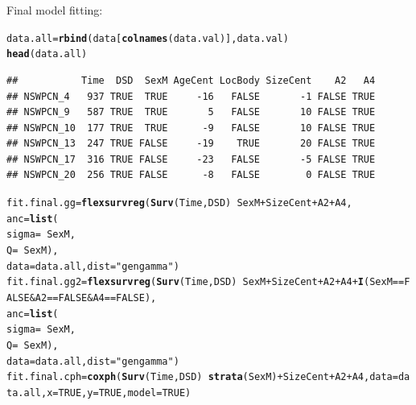 \documentclass{article}\usepackage[]{graphicx}\usepackage[]{color}
\makeatletter
\newcommand{\hlnum}[1]{\textcolor[rgb]{0.686,0.059,0.569}{#1}}%
\newcommand{\hlstr}[1]{\textcolor[rgb]{0.192,0.494,0.8}{#1}}%
\newcommand{\hlopt}[1]{\textcolor[rgb]{0,0,0}{#1}}%
\newcommand{\hlstd}[1]{\textcolor[rgb]{0.345,0.345,0.345}{#1}}%
\newcommand{\hlkwb}[1]{\textcolor[rgb]{0.69,0.353,0.396}{#1}}%
\newcommand{\hlkwc}[1]{\textcolor[rgb]{0.333,0.667,0.333}{#1}}%
\newcommand{\hlkwd}[1]{\textcolor[rgb]{0.737,0.353,0.396}{\textbf{#1}}}%
\newenvironment{kframe}{%
 \def\at@end@of@kframe{}%
 \ifinner\ifhmode%
  \def\at@end@of@kframe{\end{minipage}}%
  \begin{minipage}{\columnwidth}%
 \fi\fi%
 \def\FrameCommand##1{\hskip\@totalleftmargin \hskip-\fboxsep
 \colorbox{shadecolor}{##1}\hskip-\fboxsep
     \hskip-\linewidth \hskip-\@totalleftmargin \hskip\columnwidth}%
 \MakeFramed {\advance\hsize-\width
   \@totalleftmargin\z@ \linewidth\hsize
   \@setminipage}}%
 {\par\unskip\endMakeFramed%
 \at@end@of@kframe}
\newenvironment{knitrout}{}{} %
\makeatother
\begin{document}
Final model fitting:
\begin{knitrout}
\color{fgcolor}\begin{kframe}
\begin{alltt}
\hlstd{data.all} \hlkwb{=} \hlkwd{rbind}\hlstd{(data[}\hlkwd{colnames}\hlstd{(data.val)], data.val)}
\hlkwd{head}\hlstd{(data.all)}
\end{alltt}
\begin{verbatim}
##           Time  DSD  SexM AgeCent LocBody SizeCent    A2   A4
## NSWPCN_4   937 TRUE  TRUE     -16   FALSE       -1 FALSE TRUE
## NSWPCN_9   587 TRUE  TRUE       5   FALSE       10 FALSE TRUE
## NSWPCN_10  177 TRUE  TRUE      -9   FALSE       10 FALSE TRUE
## NSWPCN_13  247 TRUE FALSE     -19    TRUE       20 FALSE TRUE
## NSWPCN_17  316 TRUE FALSE     -23   FALSE       -5 FALSE TRUE
## NSWPCN_20  256 TRUE FALSE      -8   FALSE        0 FALSE TRUE
\end{verbatim}
\begin{alltt}
\hlstd{fit.final.gg} \hlkwb{=} \hlkwd{flexsurvreg}\hlstd{(}\hlkwd{Surv}\hlstd{(Time, DSD)} \hlopt{~} \hlstd{SexM} \hlopt{+} \hlstd{SizeCent} \hlopt{+} \hlstd{A2} \hlopt{+} \hlstd{A4,}
        \hlkwc{anc} \hlstd{=} \hlkwd{list}\hlstd{(}
                \hlkwc{sigma} \hlstd{=} \hlopt{~} \hlstd{SexM,}
                \hlkwc{Q} \hlstd{=} \hlopt{~} \hlstd{SexM),}
        \hlkwc{data} \hlstd{= data.all,} \hlkwc{dist} \hlstd{=} \hlstr{"gengamma"}\hlstd{)}
\hlstd{fit.final.gg2} \hlkwb{=} \hlkwd{flexsurvreg}\hlstd{(}\hlkwd{Surv}\hlstd{(Time, DSD)} \hlopt{~} \hlstd{SexM} \hlopt{+} \hlstd{SizeCent} \hlopt{+} \hlstd{A2} \hlopt{+} \hlstd{A4} \hlopt{+} \hlkwd{I}\hlstd{(SexM} \hlopt{==} \hlnum{FALSE} \hlopt{&} \hlstd{A2} \hlopt{==} \hlnum{FALSE} \hlopt{&} \hlstd{A4} \hlopt{==} \hlnum{FALSE}\hlstd{),}
    \hlkwc{anc} \hlstd{=} \hlkwd{list}\hlstd{(}
        \hlkwc{sigma} \hlstd{=} \hlopt{~} \hlstd{SexM,}
        \hlkwc{Q} \hlstd{=} \hlopt{~} \hlstd{SexM),}
    \hlkwc{data} \hlstd{= data.all,} \hlkwc{dist} \hlstd{=} \hlstr{"gengamma"}\hlstd{)}
\hlstd{fit.final.cph} \hlkwb{=} \hlkwd{coxph}\hlstd{(}\hlkwd{Surv}\hlstd{(Time, DSD)} \hlopt{~} \hlkwd{strata}\hlstd{(SexM)} \hlopt{+} \hlstd{SizeCent} \hlopt{+} \hlstd{A2} \hlopt{+} \hlstd{A4,} \hlkwc{data} \hlstd{= data.all,} \hlkwc{x} \hlstd{=} \hlnum{TRUE}\hlstd{,} \hlkwc{y} \hlstd{=} \hlnum{TRUE}\hlstd{,} \hlkwc{model} \hlstd{=} \hlnum{TRUE}\hlstd{)}

\end{alltt}
\end{kframe}
\end{knitrout}
\end{document}

